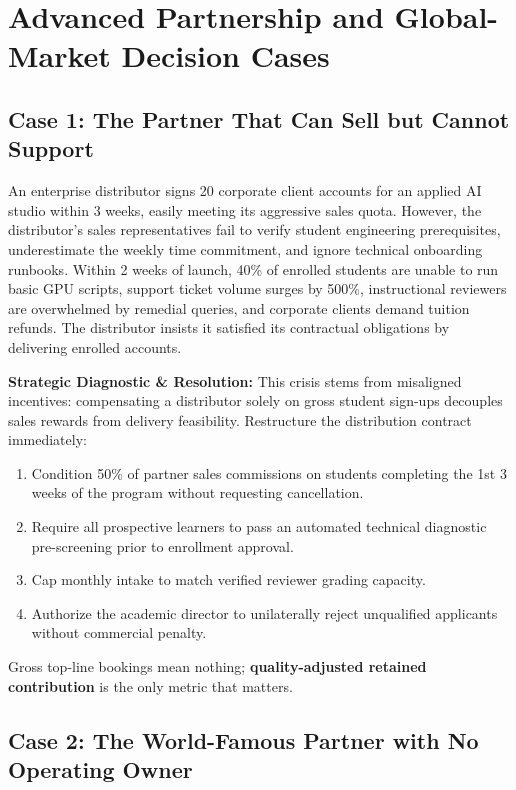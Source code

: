 \section{Advanced Partnership and Global-Market Decision Cases}
\label{sec:ch30_advanced_decision_cases}

\subsection{Case 1: The Partner That Can Sell but Cannot Support}
\label{sec:case1_sell_without_support}

An enterprise distributor signs 20 corporate client accounts for an applied AI studio within 3 weeks, easily meeting its aggressive sales quota. However, the distributor's sales representatives fail to verify student engineering prerequisites, underestimate the weekly time commitment, and ignore technical onboarding runbooks. Within 2 weeks of launch, 40\% of enrolled students are unable to run basic GPU scripts, support ticket volume surges by 500\%, instructional reviewers are overwhelmed by remedial queries, and corporate clients demand tuition refunds. The distributor insists it satisfied its contractual obligations by delivering enrolled accounts.

\textbf{Strategic Diagnostic \& Resolution:} This crisis stems from misaligned incentives: compensating a distributor solely on gross student sign-ups decouples sales rewards from delivery feasibility. Restructure the distribution contract immediately:
\begin{enumerate}
\item Condition 50\% of partner sales commissions on students completing the 1st 3 weeks of the program without requesting cancellation.
\item Require all prospective learners to pass an automated technical diagnostic pre-screening prior to enrollment approval.
\item Cap monthly intake to match verified reviewer grading capacity.
\item Authorize the academic director to unilaterally reject unqualified applicants without commercial penalty.
\end{enumerate}
Gross top-line bookings mean nothing; \textbf{quality-adjusted retained contribution} is the only metric that matters.

\subsection{Case 2: The World-Famous Partner with No Operating Owner}
\label{sec:case2_world_famous_no_owner}

